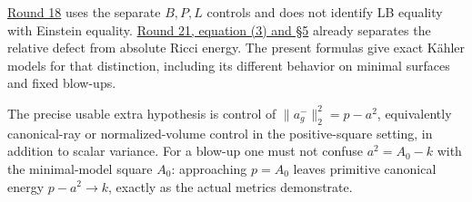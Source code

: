 \documentclass[
  11pt,
]{article}
\begin{document}
\href{round18_periods.md}{Round 18} uses the separate \(B,P,L\) controls
and does not identify LB equality with Einstein equality.
\href{round21_comparison.md}{Round 21, equation (3) and §5} already
separates the relative defect from absolute Ricci energy. The present
formulas give exact Kähler models for that distinction, including its
different behavior on minimal surfaces and fixed blow-ups.

The precise usable extra hypothesis is control of
\(\|a_g^-\|_2^2=p-a^2\), equivalently canonical-ray or normalized-volume
control in the positive-square setting, in addition to scalar variance.
For a blow-up one must not confuse \(a^2=A_0-k\) with the minimal-model
square \(A_0\): approaching \(p=A_0\) leaves primitive canonical energy
\(p-a^2\to k\), exactly as the actual metrics demonstrate.
\end{document}
